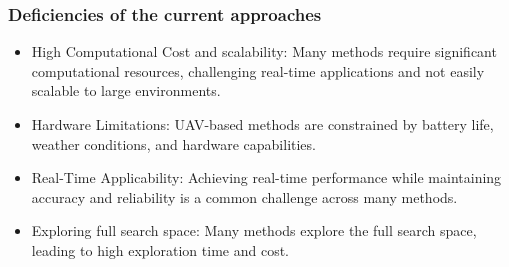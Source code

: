 \documentclass[aspectratio=169]{beamer}
\begin{document}
\begin{frame}
\frametitle{Deficiencies of the current approaches}
\begin{itemize}
  \item High Computational Cost and scalability: Many methods require significant computational resources, challenging real-time applications and not easily scalable to large environments.
  \item Hardware Limitations: UAV-based methods are constrained by battery life, weather conditions, and hardware capabilities.
  \item Real-Time Applicability: Achieving real-time performance while maintaining accuracy and reliability is a common challenge across many methods.
  \item Exploring full search space: Many methods explore the full search space, leading to high exploration time and cost.
\end{itemize}
\end{frame}
\end{document}
